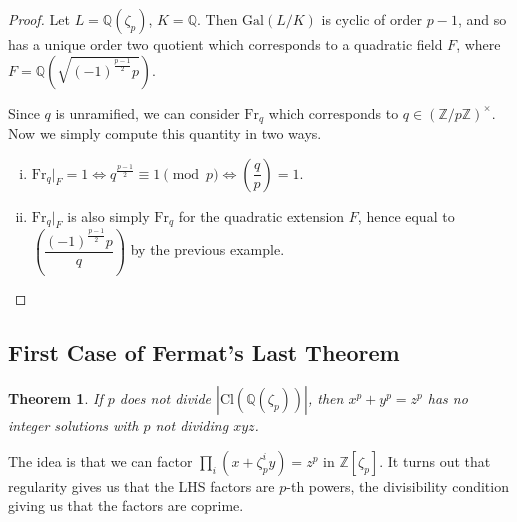 \documentclass[letterpaper, 12pt]{article}
\newtheorem{thm}{Theorem}[subsection]
\newcommand{\cl}[1]{{\mathrm{Cl}(#1)}}
\newcommand{\gal}[3]{\mathrm{Gal}(#1 #2 #3)}
\newcommand{\rats}{\mathbb{Q}}
\newcommand{\frob}[1]{\mathrm{Fr}_{#1}}
\newcommand{\legndr}[2]{\left(\dfrac{#1}{#2}\right)}
\newcommand{\Zpu}{\left(\mathbb{Z}/p\mathbb{Z}\right)^\times}
\begin{document}
\begin{proof}

Let $L = \rats(\zeta_p)$, $K = \rats$. Then $\gal L/K$ is cyclic of order $p -
1$, and so has a unique order two quotient which corresponds to a quadratic
field $F$, where $F = \rats\left(\sqrt{(-1)^{\frac{p - 1}{2}}p}\right)$.

Since $q$ is unramified, we can consider $\frob q$ which corresponds to
$q \in \Zpu$. Now we simply compute this quantity in two ways.
\begin{enumerate}[(i)]

\item $\frob q \rvert_F = 1 \Leftrightarrow q^{\frac{p - 1}{2}} \equiv 1
\pmod p \Leftrightarrow \legndr q p = 1$.

\item $\frob q \rvert_F$ is also simply $\frob q$ for the quadratic
extension $F$, hence equal to $\legndr{(-1)^{\frac{p - 1}{2}} p}{q}$
by the previous example.

\end{enumerate}
\end{proof}
\subsection{First Case of Fermat's Last Theorem}
\begin{thm}

If $p$ does not divide $|\cl {\rats(\zeta_p)}|$, then $x^p + y^p = z^p$ has no
integer solutions with $p$ not dividing $xyz$.

\end{thm}

The idea is that we can factor $\prod_i (x + \zeta_p^i y) = z^p$ in
$\mathbb{Z}[\zeta_p]$. It turns out that regularity gives us that the LHS
factors are $p$-th powers, the divisibility condition giving us that the
factors are coprime.
\end{document}
